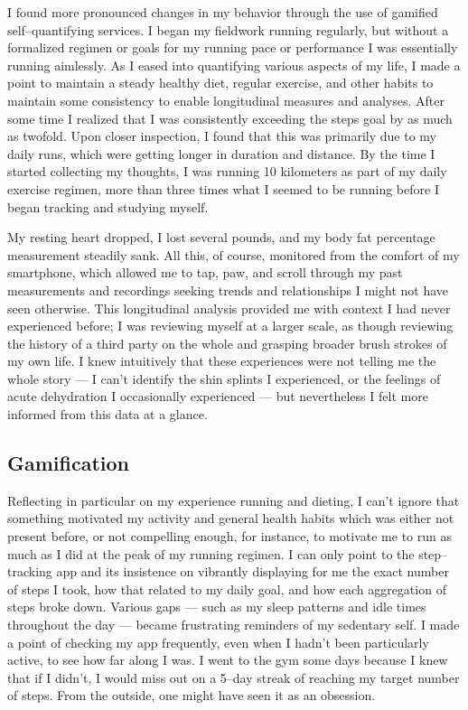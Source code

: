 \documentclass{article}
\begin{document}
I found more pronounced changes in my behavior through the use of gamified self--quantifying services.
I began my fieldwork running regularly,
but without a formalized regimen or goals for my running pace or performance I was essentially running aimlessly.
As I eased into quantifying various aspects of my life,
I made a point to maintain a steady healthy diet,
regular exercise,
and other habits to maintain some consistency to enable longitudinal measures and analyses.
After some time I realized that I was consistently exceeding the steps goal by as much as twofold.
Upon closer inspection,
I found that this was primarily due to my daily runs,
which were getting longer in duration and distance.
By the time I started collecting my thoughts,
I was running 10 kilometers as part of my daily exercise regimen,
more than three times what I seemed to be running before I began tracking and studying myself.

My resting heart dropped,
I lost several pounds,
and my body fat percentage measurement steadily sank.
All this,
of course,
monitored from the comfort of my smartphone,
which allowed me to tap,
paw,
and scroll through my past measurements and recordings seeking trends and relationships I might not have seen otherwise.
This longitudinal analysis provided me with context I had never experienced before;
I was reviewing myself at a larger scale,
as though reviewing the history of a third party on the whole and grasping broader brush strokes of my own life.
I knew intuitively that these experiences were not telling me the whole story
--- I can't identify the shin splints I experienced,
or the feelings of acute dehydration I occasionally experienced
--- but nevertheless I felt more informed from this data at a glance.

\subsection*{Gamification}
Reflecting in particular on my experience running and dieting,
I can't ignore that something motivated my activity and general health habits which was either not present before,
or not compelling enough,
for instance,
to motivate me to run as much as I did at the peak of my running regimen.
I can only point to the step--tracking app and its insistence on vibrantly displaying for me the exact number of steps I took,
how that related to my daily goal,
and how each aggregation of steps broke down.
Various gaps
--- such as my sleep patterns and idle times throughout the day ---
became frustrating reminders of my sedentary self.
I made a point of checking my app frequently,
even when I hadn't been particularly active,
to see how far along I was.
I went to the gym some days because I knew that if I didn't,
I would miss out on a 5--day streak of reaching my target number of steps.
From the outside,
one might have seen it as an obsession.
\end{document}
